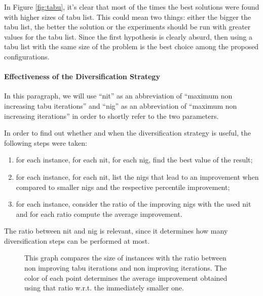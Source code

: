\documentclass{article}
\begin{document}
In Figure \ref{fig:tabu}, it's clear that most of the times the best solutions were found with higher sizes of tabu list.
This could mean two things: either the bigger the tabu list, the better the solution or the experiments should be run with greater values for the tabu list.
Since the first hypothesis is clearly absurd, then using a tabu list with the same size of the problem is the best choice among the proposed configurations.

\paragraph{Effectiveness of the Diversification Strategy}
In this paragraph, we will use ``nit'' as an abbreviation of ``maximum non increasing tabu iterations'' and ``nig'' as an abbreviation of ``maximum non increasing iterations'' in order to shortly refer to the two parameters.

In order to find out whether and when the diversification strategy is useful, the following steps were taken:
\begin{enumerate}
    \item for each instance, for each nit, for each nig, find the best value of the result;
    \item for each instance, for each nit, list the nigs that lead to an improvement when compared to smaller nigs and the respective percentile improvement;
    \item for each instance, consider the ratio of the improving nigs with the used nit and for each ratio compute the average improvement.
\end{enumerate}

The ratio between nit and nig is relevant, since it determines how many diversification steps can be performed at most.

\begin{figure}
    \centering
    \caption{
        This graph compares the size of instances with the ratio between non improving tabu iterations and non improving iterations.
        The color of each point determines the average improvement obtained using that ratio w.r.t. the immediately smaller one.
    }
    \label{fig:div}
\end{figure}
\end{document}
